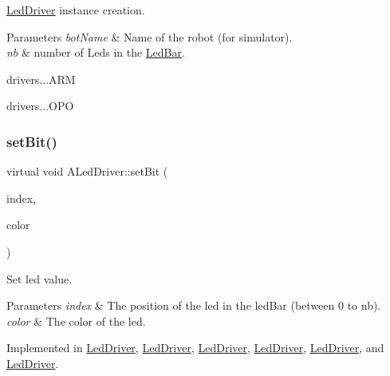 \hyperlink{classLedDriver}{Led\+Driver} instance creation. 


\begin{DoxyParams}{Parameters}
{\em bot\+Name} & Name of the robot (for simulator). \\
\hline
{\em nb} & number of Leds in the \hyperlink{classLedBar}{Led\+Bar}.\\
\hline
\end{DoxyParams}
drivers...A\+RM

drivers...O\+PO \mbox{\label{classALedDriver_acbc8507c36f0f4fa3afb845d81e56eb2}} 
\subsubsection{\texorpdfstring{set\+Bit()}{setBit()}}
{\footnotesize\ttfamily virtual void A\+Led\+Driver\+::set\+Bit (\begin{DoxyParamCaption}\item[{int}]{index,  }\item[{Led\+Color}]{color }\end{DoxyParamCaption})\hspace{0.3cm}{\ttfamily [pure virtual]}}



Set led value. 


\begin{DoxyParams}{Parameters}
{\em index} & The position of the led in the led\+Bar (between 0 to nb). \\
\hline
{\em color} & The color of the led. \\
\hline
\end{DoxyParams}


Implemented in \hyperlink{classLedDriver_a1856fb030d88bcacdc37dfce7f0f8136}{Led\+Driver}, \hyperlink{classLedDriver_af5ec63943cb92b14a887fdd2a5491e93}{Led\+Driver}, \hyperlink{classLedDriver_a1856fb030d88bcacdc37dfce7f0f8136}{Led\+Driver}, \hyperlink{classLedDriver_a1856fb030d88bcacdc37dfce7f0f8136}{Led\+Driver}, \hyperlink{classLedDriver_af5ec63943cb92b14a887fdd2a5491e93}{Led\+Driver}, and \hyperlink{classLedDriver_af5ec63943cb92b14a887fdd2a5491e93}{Led\+Driver}.

\mbox{\label{classALedDriver_a3a219f7546870d4bce0ae36cad3b0518}} 
